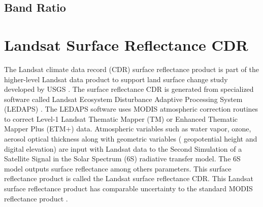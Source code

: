 \subsection{Band Ratio}

\section{Landsat Surface Reflectance CDR}
\label{sec:CDR} 
The Landsat climate data record (CDR) surface reflectance product is part of the higher-level Landsat data product to support land surface change study developed by USGS \cite{LandsatCDR}. The surface reflectance CDR is generated from specialized software called Landsat Ecosystem Disturbance Adaptive Processing System (LEDAPS) \cite{Masek:2006}. The LEDAPS software uses MODIS atmospheric correction routines to correct Level-1 Landsat Thematic Mapper (TM) or Enhanced Thematic Mapper Plus (ETM+) data. Atmospheric variables such as water vapor, ozone, aerosol optical thickness along with geometric variables ({ geopotential height} and digital elevation) are input with Landsat data to the Second Simulation of a Satellite Signal in the Solar Spectrum (6S) radiative transfer model. The 6S model outputs surface reflectance among others parameters. This surface reflectance product is called the Landsat surface reflectance CDR. This Landsat surface reflectance product has comparable uncertainty to the standard MODIS reflectance product \cite{Masek:2006}.

